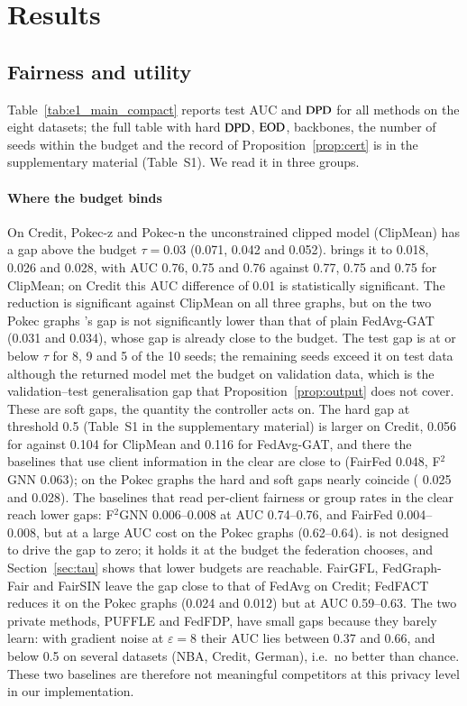 \section{Results}\label{sec:results}



\subsection{Fairness and utility}\label{sec:main}

Table~\ref{tab:e1_main_compact} reports test AUC and $\mathrm{DPD}$ for all methods on the eight datasets; the full table with hard $\mathrm{DPD}$, $\mathrm{EOD}$, backbones, the number of seeds within the budget and the record of Proposition~\ref{prop:cert} is in the supplementary material (Table~S1). We read it in three groups.

\paragraph{Where the budget binds}
On Credit, Pokec-z and Pokec-n the unconstrained clipped model (ClipMean) has a gap above the budget $\tau=0.03$ (0.071, 0.042 and 0.052). \clamp{} brings it to 0.018, 0.026 and 0.028, with AUC 0.76, 0.75 and 0.76 against 0.77, 0.75 and 0.75 for ClipMean; on Credit this AUC difference of 0.01 is statistically significant. The reduction is significant against ClipMean on all three graphs, but on the two Pokec graphs \clamp{}'s gap is not significantly lower than that of plain FedAvg-GAT (0.031 and 0.034), whose gap is already close to the budget. The test gap is at or below $\tau$ for 8, 9 and 5 of the 10 seeds; the remaining seeds exceed it on test data although the returned model met the budget on validation data, which is the validation--test generalisation gap that Proposition~\ref{prop:output} does not cover. These are soft gaps, the quantity the controller acts on. The hard gap at threshold 0.5 (Table~S1 in the supplementary material) is larger on Credit, 0.056 for \clamp{} against 0.104 for ClipMean and 0.116 for FedAvg-GAT, and there the baselines that use client information in the clear are close to \clamp{} (FairFed 0.048, F$^2$GNN 0.063); on the Pokec graphs the hard and soft gaps nearly coincide (\clamp{} 0.025 and 0.028). The baselines that read per-client fairness or group rates in the clear reach lower gaps: F$^2$GNN 0.006--0.008 at AUC 0.74--0.76, and FairFed 0.004--0.008, but at a large AUC cost on the Pokec graphs (0.62--0.64). \clamp{} is not designed to drive the gap to zero; it holds it at the budget the federation chooses, and Section~\ref{sec:tau} shows that lower budgets are reachable. FairGFL, FedGraph-Fair and FairSIN leave the gap close to that of FedAvg on Credit; FedFACT reduces it on the Pokec graphs (0.024 and 0.012) but at AUC 0.59--0.63. The two private methods, PUFFLE and FedFDP, have small gaps because they barely learn: with gradient noise at $\varepsilon=8$ their AUC lies between 0.37 and 0.66, and below 0.5 on several datasets (NBA, Credit, German), i.e.\ no better than chance. These two baselines are therefore not meaningful competitors at this privacy level in our implementation.


